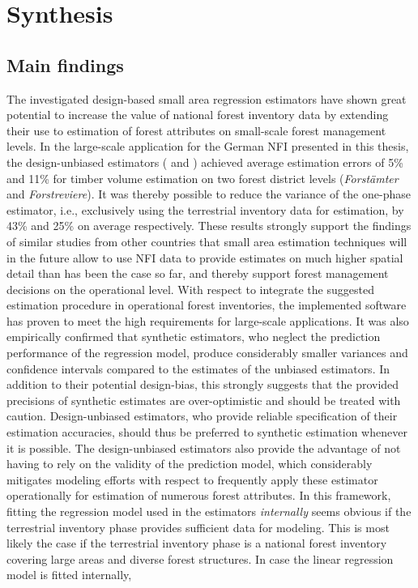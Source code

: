 	
\chapter{Synthesis}
\label{chap:synth}
\newpage



\section{Main findings}
\label{sec:synth:mainfind}


The investigated design-based small area regression estimators have shown great potential to increase the value of national forest inventory data by extending their use to estimation of forest attributes on small-scale forest management levels. In the large-scale application for the German NFI presented in this thesis, the design-unbiased estimators (\psmall{} and \extpsynth{}) achieved average estimation errors of 5\% and 11\% for timber volume estimation on two forest district levels (\textit{Forst{\"a}mter} and \textit{Forstreviere}). It was thereby possible to reduce the variance of the one-phase estimator, i.e., exclusively using the terrestrial inventory data for estimation, by 43\% and 25\% on average respectively. These results strongly support the findings of similar studies from other countries that small area estimation techniques will in the future allow to use NFI data to provide estimates on much higher spatial detail than has been the case so far, and thereby support forest management decisions on the operational level. With respect to integrate the suggested estimation procedure in operational forest inventories, the implemented software has proven to meet the high requirements for large-scale applications. It was also empirically confirmed that synthetic estimators, who neglect the prediction performance of the regression model, produce considerably smaller variances and confidence intervals compared to the estimates of the unbiased estimators. In addition to their potential design-bias, this strongly suggests that the provided precisions of synthetic estimates are over-optimistic and should be treated with caution. Design-unbiased estimators, who provide reliable specification of their estimation accuracies, should thus be preferred to synthetic estimation whenever it is possible. The design-unbiased estimators also provide the advantage of not having to rely on the validity of the prediction model, which considerably mitigates modeling efforts with respect to frequently apply these estimator operationally for estimation of numerous forest attributes. In this framework, fitting the regression model used in the estimators \textit{internally} seems obvious if the terrestrial inventory phase provides sufficient data for modeling. This is most likely the case if the terrestrial inventory phase is a national forest inventory covering large areas and diverse forest structures. In case the linear regression model is fitted internally, 